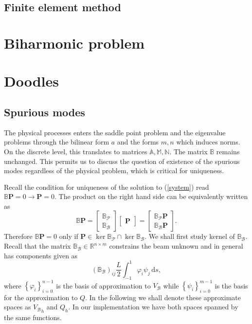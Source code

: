 \documentclass[a4paper,10pt]{article}
\newcommand{\R}{\ensuremath{\mathbb{R}}}
\newcommand{\meas}[1]{\ensuremath{\,\mathrm{d}#1}}
\newcommand{\Vb}{\ensuremath{V_{\mathcal{B}}}}
\newcommand{\Bp}{\ensuremath{\mathbb{B}_{\mathcal{P}}}}
\newcommand{\Bb}{\ensuremath{\mathbb{B}_{\mathcal{B}}}}
\newcommand{\Amat}{\ensuremath{\mathbb{A}}}
\newcommand{\Bmat}{\ensuremath{\mathbb{B}}}
\newcommand{\Mmat}{\ensuremath{\mathbb{M}}}
\newcommand{\Nmat}{\ensuremath{\mathbb{N}}}
\newcommand{\Pvec}{\ensuremath{\mathbf{P}}}
\begin{document}
\subsection{Finite element method}
\section{Biharmonic problem}
\section{Doodles}
\subsection{Spurious modes}
The physical processes enters the saddle point problem and the eigenvalue
problems through the bilinear form $a$ and the forms $m, n$ which induces norms.
On the discrete level, this translates to matrices $\Amat, \Mmat, \Nmat$. The 
matrix $\Bmat$ remains unchanged. This permits us to discuss the question of
existence of the spurious modes regardless of the physical problem, which is
critical for uniqueness.


Recall the condition for uniqueness of the solution to (\ref{system}) read
$\Bmat\Pvec=0\rightarrow\Pvec=0$. The product on the right hand side can
be equivalently written as
\[
  \Bmat\Pvec = \begin{bmatrix}
                \Bp \\
                \Bb
               \end{bmatrix}
               \begin{bmatrix}
                 \Pvec
               \end{bmatrix}
               =\begin{bmatrix}
                \Bp\Pvec \\
                \Bb\Pvec
               \end{bmatrix}.
\]
Therefore $\Bmat\Pvec=0$ only if $\Pvec\in\ker{\Bp}\cap\ker{\Bb}$. We shall
first study kernel of $\Bb$. Recall that the matrix $\Bb\in \R^{n \times m}$
constrains the beam unknown and in general has components given as
\[
  \left(\Bb\right)_{ij}\frac{L}{2}\int_{-1}^{1}\varphi_i\psi_j\meas{s},
\]
where $\left\{\varphi_i\right\}_{i=0}^{n-1}$ is the basis of approximation
to $\Vb$ while $\left\{\psi_i\right\}_{i=0}^{m-1}$ is the basis for the
approximation to $Q$. In the following we shall denote these approximate spaces
as ${\Vb}_h$ and $Q_h$. In our implementation we have both spaces spanned by
the same functions.
\end{document}
